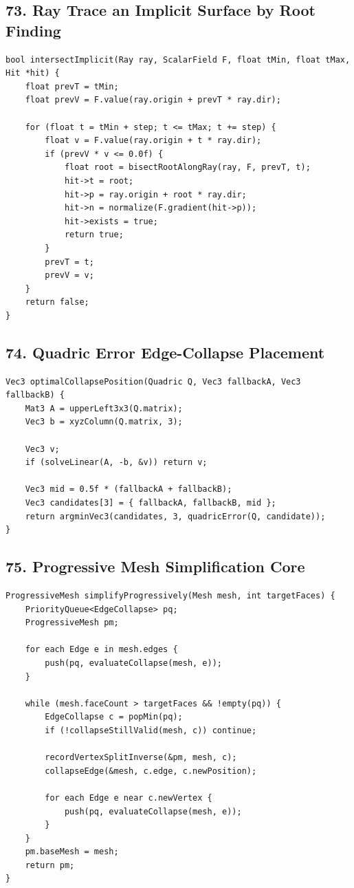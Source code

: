 \documentclass[10pt,letterpaper]{article}
\begin{document}
\subsection{73. Ray Trace an Implicit Surface by Root Finding}

\begin{verbatim}
bool intersectImplicit(Ray ray, ScalarField F, float tMin, float tMax, Hit *hit) {
    float prevT = tMin;
    float prevV = F.value(ray.origin + prevT * ray.dir);

    for (float t = tMin + step; t <= tMax; t += step) {
        float v = F.value(ray.origin + t * ray.dir);
        if (prevV * v <= 0.0f) {
            float root = bisectRootAlongRay(ray, F, prevT, t);
            hit->t = root;
            hit->p = ray.origin + root * ray.dir;
            hit->n = normalize(F.gradient(hit->p));
            hit->exists = true;
            return true;
        }
        prevT = t;
        prevV = v;
    }
    return false;
}
\end{verbatim}

\subsection{74. Quadric Error Edge-Collapse Placement}

\begin{verbatim}
Vec3 optimalCollapsePosition(Quadric Q, Vec3 fallbackA, Vec3 fallbackB) {
    Mat3 A = upperLeft3x3(Q.matrix);
    Vec3 b = xyzColumn(Q.matrix, 3);

    Vec3 v;
    if (solveLinear(A, -b, &v)) return v;

    Vec3 mid = 0.5f * (fallbackA + fallbackB);
    Vec3 candidates[3] = { fallbackA, fallbackB, mid };
    return argminVec3(candidates, 3, quadricError(Q, candidate));
}
\end{verbatim}

\subsection{75. Progressive Mesh Simplification Core}

\begin{verbatim}
ProgressiveMesh simplifyProgressively(Mesh mesh, int targetFaces) {
    PriorityQueue<EdgeCollapse> pq;
    ProgressiveMesh pm;

    for each Edge e in mesh.edges {
        push(pq, evaluateCollapse(mesh, e));
    }

    while (mesh.faceCount > targetFaces && !empty(pq)) {
        EdgeCollapse c = popMin(pq);
        if (!collapseStillValid(mesh, c)) continue;

        recordVertexSplitInverse(&pm, mesh, c);
        collapseEdge(&mesh, c.edge, c.newPosition);

        for each Edge e near c.newVertex {
            push(pq, evaluateCollapse(mesh, e));
        }
    }
    pm.baseMesh = mesh;
    return pm;
}
\end{verbatim}
\end{document}
